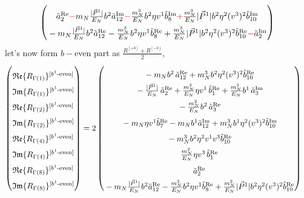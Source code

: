 \documentclass[]{article}
\numberwithin{equation}{section}
\newcommand{\bvec}{b}
\newcommand{\mN}{m_N}
\begin{document}
\begin{align}
\begin{pmatrix}
      \rule{0pt}{16pt}  \tilde a^{\text{Re}}_2 \textcolor{red}{-}  \mN  \frac{|\vec{P}^1|}{E_N} \bvec^2  \tilde a^{\text{Im}}_{12}\textcolor{red}{-} \frac{  \mN^3}{E_N}  \bvec^2 \eta v^1  \tilde b^{\text{Im}}_8\textcolor{red}{+} \frac{ \mN^3}{E_N}  |\vec{P}^1| \bvec^2 \eta^2 (v^3)^2 \tilde b^{\text{Im}}_{10}\\
      \rule{0pt}{16pt} - \mN  \frac{|\vec{P}^1|}{E_N} \bvec^2  \tilde a^{\text{Re}}_{12}- \frac{  \mN^3}{E_N}  \bvec^2 \eta v^1  \tilde b^{\text{Re}}_8 + \frac{ \mN^3}{E_N}  |\vec{P}^1| \bvec^2 \eta^2 (v^3)^2 \tilde b^{\text{Re}}_{10}\textcolor{red}{-}\tilde a^{\text{Im}}_2
    \end{pmatrix}
\end{align}
let's now form $b-$even part as $\frac{R^{[+b]}+R^{[-b]}}{2}$,
\begin{align}
    \begin{pmatrix}
        \rule{0pt}{16pt} \mathfrak{Re}\{ R_{\Gamma(1)}\}^{[b^{1}\text{-even}]} \\
        \rule{0pt}{16pt} \mathfrak{Im}\{ R_{\Gamma(1)}\}^{[b^{1}\text{-even}]} \\
        \rule{0pt}{16pt} \mathfrak{Re}\{ R_{\Gamma(2)}\}^{[b^{1}\text{-even}]} \\
        \rule{0pt}{16pt} \mathfrak{Im}\{ R_{\Gamma(2)}\}^{[b^{1}\text{-even}]} \\
        \rule{0pt}{16pt} \mathfrak{Re}\{ R_{\Gamma(4)}\}^{[b^{1}\text{-even}]} \\
        \rule{0pt}{16pt} \mathfrak{Im}\{ R_{\Gamma(4)}\}^{[b^{1}\text{-even}]} \\
        \rule{0pt}{16pt} \mathfrak{Re}\{ R_{\Gamma(8)}\}^{[b^{1}\text{-even}]} \\
        \rule{0pt}{16pt} \mathfrak{Im}\{ R_{\Gamma(8)}\}^{[b^{1}\text{-even}]}
    \end{pmatrix} &= 2\begin{pmatrix}
     \rule{0pt}{16pt}  -  \mN  \bvec^2 \, \tilde a^{\text{Re}}_{12}+  \mN^3  \bvec^2 \eta^2 (v^3)^2 \tilde b^{\text{Re}}_{10} \\
      \rule{0pt}{16pt}  -\frac{|\vec{P}^1|}{E_N}\, \tilde a^{\text{Re}}_2+ \frac{\mN^2}{E_N} \eta v^1\, \tilde b^{\text{Re}}_1 + \frac{\mN^2}{E_N} \bvec^1\, \tilde a^{\text{Im}}_3\\
      \rule{0pt}{16pt}  -  \frac{\mN^2}{E_N} \bvec^2\, \tilde a^{\text{Re}}_3
		\\
      \rule{0pt}{16pt} - \mN \eta v^1  \tilde b^{\text{Re}}_7
		-  \mN   \bvec^1  \tilde a^{\text{Im}}_{12}+ \mN^3  \bvec^1 \eta^2 (v^3)^2 \tilde b^{\text{Im}}_{10}\\
      \rule{0pt}{16pt} -\mN^3 \bvec^2 \eta^2 v^1 v^3\tilde b^{\text{Re}}_{10}\\
      \rule{0pt}{16pt} \frac{\mN^2}{E_N} \eta v^3\, \tilde b^{\text{Re}}_1 \\
      \rule{0pt}{16pt}  \tilde a^{\text{Re}}_2\\
      \rule{0pt}{16pt} -  \mN  \frac{|\vec{P}^1|}{E_N} \bvec^2  \tilde a^{\text{Re}}_{12}- \frac{  \mN^3}{E_N}  \bvec^2 \eta v^1  \tilde b^{\text{Re}}_8+ \frac{ \mN^3}{E_N}  |\vec{P}^1| \bvec^2 \eta^2 (v^3)^2 \tilde b^{\text{Re}}_{10}
    \end{pmatrix}
\end{align}
\end{document}
